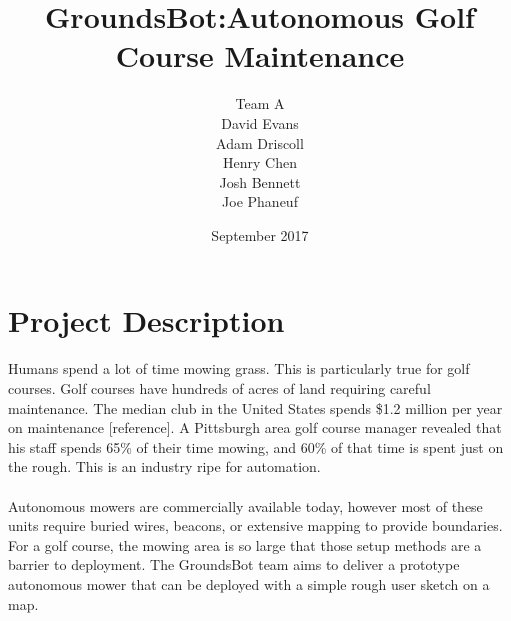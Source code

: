 \documentclass{article}
\begin{document}


\title{GroundsBot:Autonomous Golf Course Maintenance}
\date{September 2017}
\author{Team A        \\ David Evans \\
        Adam Driscoll \\ Henry Chen  \\
        Josh Bennett  \\ Joe Phaneuf \\ }
\maketitle
\newpage

\tableofcontents
\newpage

\section{Project Description}
Humans spend a lot of time mowing grass. This is particularly true for golf courses. Golf courses have hundreds of acres of land requiring careful maintenance.  The median club in the United States spends \$1.2 million per year on maintenance [reference]. A Pittsburgh area golf course manager revealed that his staff spends 65\% of their time mowing, and 60\% of that time is spent just on the rough. This is an industry ripe for automation.
\\
\\
Autonomous mowers are commercially available today, however most of these units require buried wires, beacons, or extensive mapping to provide boundaries. For a golf course, the mowing area is so large that those setup methods are a barrier to deployment. The GroundsBot team aims to deliver a prototype autonomous mower that can be deployed with a simple rough user sketch on a map.
\end{document}
